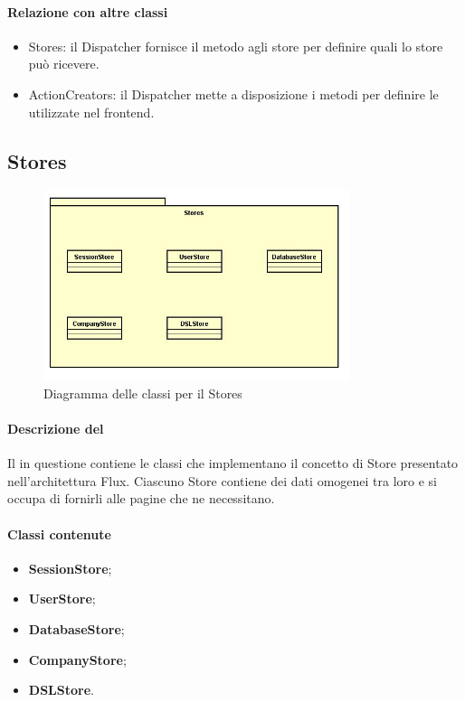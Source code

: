 \paragraph*{Relazione con altre classi}
\begin{itemize}
\item Stores: il Dispatcher fornisce il metodo agli store per definire quali  lo store può ricevere.
\item ActionCreators: il Dispatcher mette a disposizione i metodi per definire le  utilizzate nel frontend.
\end{itemize}


\subsection{Stores}

\begin{figure}[h]
\centering
\includegraphics[width=0.8\textwidth]{res/sections/imgs/stores-diagram.jpg}
\caption{Diagramma delle classi per il  Stores}
\end{figure}

\paragraph*{Descrizione del }
Il  in questione contiene le classi che implementano il concetto di Store presentato nell'architettura Flux. Ciascuno Store contiene dei dati omogenei tra loro e si occupa di fornirli alle pagine che ne necessitano.
\paragraph*{Classi contenute}
\begin{itemize}
\item \textbf{SessionStore};
\item \textbf{UserStore};
\item \textbf{DatabaseStore};
\item \textbf{CompanyStore};
\item \textbf{DSLStore}.
\end{itemize}

